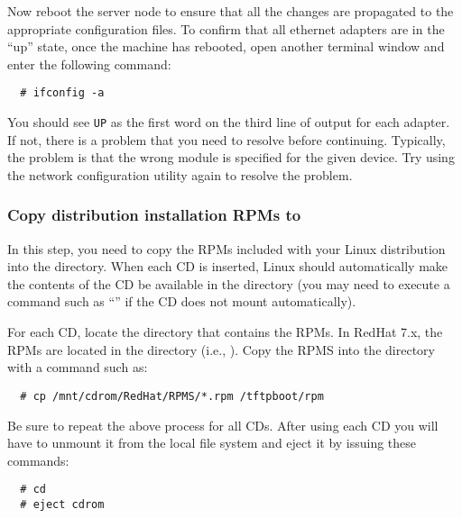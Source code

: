 Now reboot the server node to ensure that all the changes are
propagated to the appropriate configuration files. To confirm that all
ethernet adapters are in the ``up'' state, once the machine has
rebooted, open another terminal window and enter the following
command:

\begin{verbatim}
  # ifconfig -a
\end{verbatim}
  
You should see {\tt UP} as the first word on the third line of output
for each adapter. If not, there is a problem that you need to resolve
before continuing. Typically, the problem is that the wrong module is
specified for the given device. Try using the network configuration
utility again to resolve the problem.
  

\subsubsection{Copy distribution installation RPMs to }
\label{det:rpmcopy}

In this step, you need to copy the RPMs included with your Linux
distribution into the  directory.  When each CD is
inserted, Linux should automatically make the contents of the CD be
available in the  directory (you may need to execute
a command such as ``'' if the CD does not mount
automatically).  

For each CD, locate the directory that contains the RPMs.  In RedHat
7.x, the RPMs are located in the  directory (i.e.,
).  Copy the RPMS into the
 directory with a command such as:

\begin{verbatim}
  # cp /mnt/cdrom/RedHat/RPMS/*.rpm /tftpboot/rpm
\end{verbatim}
  
Be sure to repeat the above process for all CDs.  After using each CD
you will have to unmount it from the local file system and eject it by
issuing these commands:

\begin{verbatim}
  # cd
  # eject cdrom
\end{verbatim}


